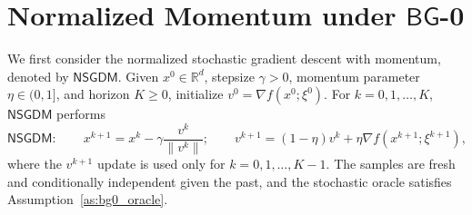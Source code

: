 \documentclass[letter,11pt]{article}
\newcommand{\R}{\mathbb{R}}
\begin{document}
\section{Normalized Momentum under \texorpdfstring{$\mathsf{BG}$}{BG}-0}
\label{sec:NSGDM}
We first consider the normalized stochastic gradient descent with momentum, denoted by $\mathsf{NSGDM}$. Given $x^0\in\R^d$, stepsize $\gamma>0$, momentum parameter $\eta\in(0,1]$, and horizon $K\ge0$, initialize $v^0=\nabla f(x^0;\xi^0).$ For $k=0,1,\ldots,K$, $\mathsf{NSGDM}$ performs
\begin{equation}
\label{eq:nsgdm_updates}
\mathsf{NSGDM:}\qquad
x^{k+1} = x^k-\gamma\frac{v^k}{\|v^k\|};
\qquad
v^{k+1} = (1-\eta)v^k+\eta\nabla f(x^{k+1};\xi^{k+1}),
\end{equation}
where the $v^{k+1}$ update is used only for $k=0,1,\ldots,K-1$. The samples are fresh and conditionally independent given the past, and the stochastic oracle satisfies Assumption~\ref{as:bg0_oracle}. 
\end{document}
